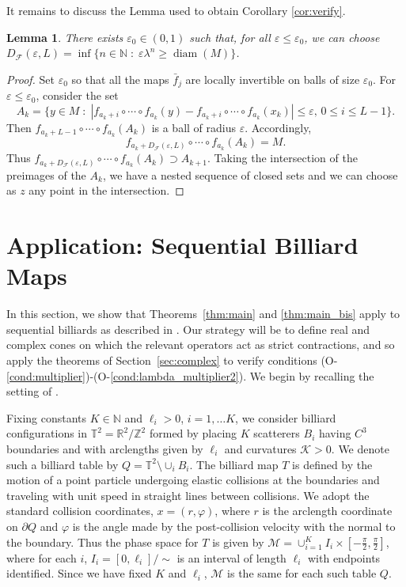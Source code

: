 \documentclass{amsart}
\numberwithin{equation}{section}
\newtheorem{lem}[thm]{Lemma}
\newcommand\cF{{\mathcal F}}
\newcommand\cK{{\mathcal K}}
\newcommand\cM{{\mathcal M}}
\newcommand\bN{{\mathbb N}}
\newcommand\ve{\varepsilon}
\newcommand\vf{\varphi}
\begin{document}
It remains to discuss the Lemma used to obtain Corollary \ref{cor:verify}.
\begin{lem}\label{lem:specif}  There exists $\ve_0\in(0,1)$ such that, for all $\ve\leq \ve_0$, we can choose $D_{\cF}(\ve,L)=\inf\{n\in\bN\;:\; \ve\lambda^n\geq \operatorname{diam}(M)\}$.
\end{lem}
\begin{proof}
Set $\ve_0$ so that all the maps $\bar f_j$ are locally invertible on balls of size $\ve_0$.
For $\ve \le \ve_0$, consider the set  
\[
A_k=\{y\in M\;:\; | f_{a_k+i}\circ\cdots\circ f_{a_k}(y)- f_{a_k+i}\circ\cdots\circ  f_{a_k}(x_k)|\leq \ve,\, 0\leq i\leq L-1\}.
\]
Then $ f_{a_k+L-1}\circ\cdots\circ f_{a_k}(A_k)$ is a ball of radius $\ve$. Accordingly, 
\[ 
f_{a_k+D_{\cF}(\ve,L)}\circ\cdots\circ f_{a_k}(A_k)= M.
\]
Thus $f_{a_k+D_{\cF}(\ve,L)}\circ\cdots\circ f_{a_k}(A_k)\supset A_{k+1}$. Taking the intersection of the preimages of the $A_k$, we have a nested sequence of closed sets and we can choose as $z$ any point in the intersection.
\end{proof}



\section{Application: Sequential Billiard Maps}
\label{sec:billiard}

In this section, we show that Theorems~\ref{thm:main} and \ref{thm:main_bis} apply to sequential billiards 
as described in \cite{DL22}.  Our strategy will be to define real and complex cones on which
the relevant operators act as strict contractions, and so apply the theorems of Section~\ref{sec:complex} to
verify conditions (O-\ref{cond:multiplier})-(O-\ref{cond:lambda_multiplier2}).
We begin by recalling the setting of \cite{DL22}.


Fixing constants $K \in \bN$ and $\ell_i >0$, $i = 1, \ldots K$,  we consider billiard configurations in 
$\mathbb{T}^2 = \mathbb{R}^2/ \mathbb{Z}^2$
formed by placing $K$ scatterers $B_i$ having $C^3$ boundaries and with arclengths given by $\ell_i$
and curvatures $\cK >0$.  We denote such a billiard table by $Q = \mathbb{T}^2 \setminus \cup_i B_i$.  The billiard map $T$
is defined by the motion of a point particle undergoing elastic collisions at the boundaries
and traveling with unit speed in straight lines between collisions.  We adopt the standard collision
coordinates, $x= (r,\vf)$, where $r$ is the arclength coordinate on $\partial Q$ and $\vf$ is the angle
made by the post-collision velocity with the normal to the boundary.
Thus the phase space for $T$ is given by $\cM = \cup_{i=1}^K I_i \times [- \frac \pi 2, \frac \pi 2]$, where for each $i$, $I_i = [0, \ell_i] / \sim$ is an interval
of length $\ell_i$ with endpoints identified.  Since we have fixed $K$ and $\ell_i$, $\cM$ is the same
for each such table $Q$.
\end{document}

